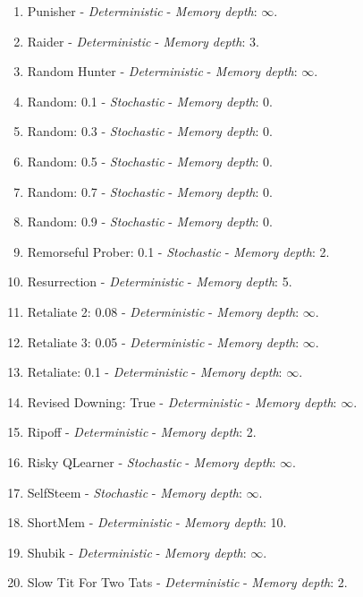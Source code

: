 \documentclass[10pt,letterpaper]{article}
\begin{document}
\begin{enumerate}
\item Punisher - \textit{Deterministic} - \textit{Memory depth}: \(\infty\). \cite{axelrodproject}
\item Raider - \textit{Deterministic} - \textit{Memory depth}: 3. \cite{Ashlock2014}
\item Random Hunter - \textit{Deterministic} - \textit{Memory depth}: \(\infty\). \cite{axelrodproject}
\item Random: 0.1 - \textit{Stochastic} - \textit{Memory depth}: 0.
\item Random: 0.3 - \textit{Stochastic} - \textit{Memory depth}: 0.
\item Random: 0.5 - \textit{Stochastic} - \textit{Memory depth}: 0. \cite{Axelrod1980, Tzafestas2000}
\item Random: 0.7 - \textit{Stochastic} - \textit{Memory depth}: 0.
\item Random: 0.9 - \textit{Stochastic} - \textit{Memory depth}: 0.
\item Remorseful Prober: 0.1 - \textit{Stochastic} - \textit{Memory depth}: 2. \cite{Li2011}
\item Resurrection - \textit{Deterministic} - \textit{Memory depth}: 5. \cite{Eckhart2015}
\item Retaliate 2: 0.08 - \textit{Deterministic} - \textit{Memory depth}: \(\infty\). \cite{axelrodproject}
\item Retaliate 3: 0.05 - \textit{Deterministic} - \textit{Memory depth}: \(\infty\). \cite{axelrodproject}
\item Retaliate: 0.1 - \textit{Deterministic} - \textit{Memory depth}: \(\infty\). \cite{axelrodproject}
\item Revised Downing: True - \textit{Deterministic} - \textit{Memory depth}: \(\infty\). \cite{Axelrod1980}
\item Ripoff - \textit{Deterministic} - \textit{Memory depth}: 2. \cite{Ashlock2008}
\item Risky QLearner - \textit{Stochastic} - \textit{Memory depth}: \(\infty\). \cite{axelrodproject}
\item SelfSteem - \textit{Stochastic} - \textit{Memory depth}: \(\infty\). \cite{Andre2013}
\item ShortMem - \textit{Deterministic} - \textit{Memory depth}: 10. \cite{Andre2013}
\item Shubik - \textit{Deterministic} - \textit{Memory depth}: \(\infty\). \cite{Axelrod1980}
\item Slow Tit For Two Tats - \textit{Deterministic} - \textit{Memory depth}: 2. \cite{axelrodproject}

\end{enumerate}
\end{document}

